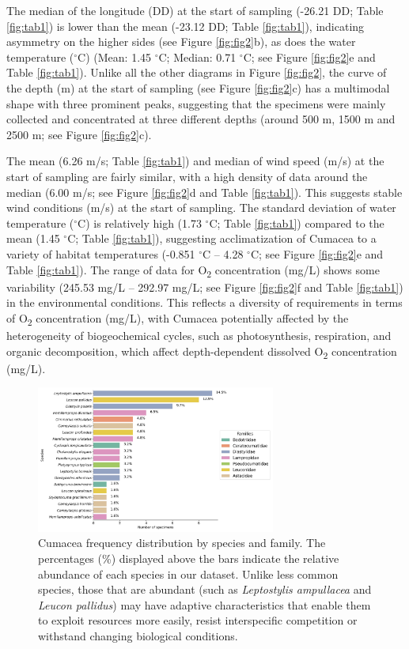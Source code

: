 {The median of the longitude (DD) at the start of sampling (-26.21 DD; Table \ref{fig:tab1}) is lower than the mean (-23.12 DD; Table \ref{fig:tab1}), indicating asymmetry on the higher sides (see Figure \ref{fig:fig2}b), as does the water temperature ($^\circ$C) (Mean: 1.45 $^\circ$C; Median: 0.71 $^\circ$C; see Figure \ref{fig:fig2}e and Table \ref{fig:tab1}). Unlike all the other diagrams in Figure \ref{fig:fig2}, the curve of the depth (m) at the start of sampling (see Figure \ref{fig:fig2}c) has a multimodal shape with three prominent peaks, suggesting that the specimens were mainly collected and concentrated at three different depths (around 500 m, 1500 m and 2500 m; see Figure \ref{fig:fig2}c).

The mean (6.26 m/s; Table \ref{fig:tab1}) and median of wind speed (m/s) at the start of sampling are fairly similar, with a high density of data around the median (6.00 m/s; see Figure \ref{fig:fig2}d and Table \ref{fig:tab1}). This suggests stable wind conditions (m/s) at the start of sampling. The standard deviation of water temperature ($^\circ$C) is relatively high (1.73 $^\circ$C; Table \ref{fig:tab1}) compared to the mean (1.45 $^\circ$C; Table \ref{fig:tab1}), suggesting acclimatization of Cumacea to a variety of habitat temperatures (-0.851 $^\circ$C – 4.28 $^\circ$C; see Figure \ref{fig:fig2}e and Table \ref{fig:tab1}). The range of data for O\textsubscript{2} concentration (mg/L) shows some variability (245.53 mg/L – 292.97 mg/L; see Figure \ref{fig:fig2}f and Table \ref{fig:tab1}) in the environmental conditions. This reflects a diversity of requirements in terms of O\textsubscript{2} concentration (mg/L), with Cumacea potentially affected by the heterogeneity of biogeochemical cycles, such as photosynthesis, respiration, and organic decomposition, which affect depth-dependent dissolved O\textsubscript{2} concentration (mg/L).

\begin{figure}[htbp]
    \centering
    \includegraphics[width=0.7\textwidth]{figure2.jpg}
    \caption{Cumacea frequency distribution by species and family. The percentages (\%) displayed above the bars indicate the relative abundance of each species in our dataset. Unlike less common species, those that are abundant (such as \emph{Leptostylis ampullacea} and \emph{Leucon pallidus}) may have adaptive characteristics that enable them to exploit resources more easily, resist interspecific competition or withstand changing biological conditions. \label{fig:fig3}}
\end{figure}

}
